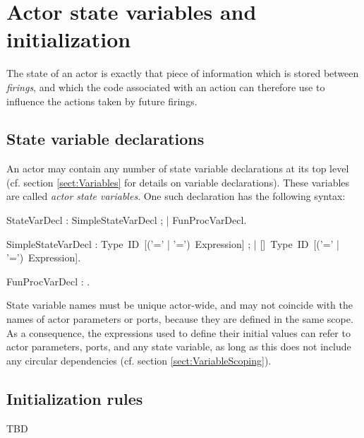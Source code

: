 
\chapter{Actor state variables and initialization}\label{sect:StateVars}

The state of an actor is exactly that piece of information which is
stored between {\em firings}, and which the code associated with an
action can therefore use to influence the actions taken by future
firings.


\section{State variable declarations}

An actor may contain any number of state variable declarations at its
top level (cf. section \ref{sect:Variables} for details on variable
declarations). These variables are called {\em actor state variables}. One such declaration has the
following syntax:

\bgr

StateVarDecl : SimpleStateVarDecl ;
     | FunProcVarDecl.

SimpleStateVarDecl : Type~ID~[('\charColon=' | '=')~Expression] ;
     | [\kwMutable]~Type~ID~[('\charColon=' | '=')~Expression].

FunProcVarDecl : .

\egr

State variable names must be unique actor-wide, and may not coincide
with the names of actor parameters or ports, because they are defined
in the same scope. As a consequence, the expressions used to
define their initial values can refer to actor parameters, ports, and
any state variable, as long as this does not include any circular
dependencies (cf. section \ref{sect:VariableScoping}).


\section{Initialization rules} \label{sect:InitRules}

TBD



